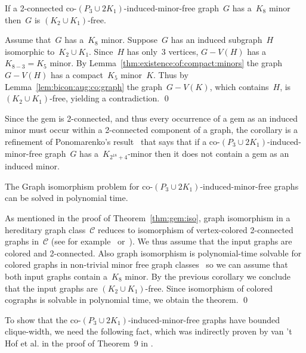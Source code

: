 \documentclass[envcountsame,envcountsect,11pt,a4paper]{llncs}
\renewenvironment{proof}{\begin{Proof}}{\qed\end{Proof}}
\begin{document}
\begin{corollary}
\label{cor:minor-free}
If a 2-connected co-$(P_{3} \cup 2 K_{1})$-induced-minor-free graph~$G$ has a~$K_8$ minor then~$G$ is $(K_{2} \cup K_{1})$-free.
\end{corollary}
\begin{proof}
Assume that~$G$ has a~$K_8$ minor. 
Suppose~$G$ has an induced subgraph~$H$ isomorphic to~$K_{2} \cup K_{1}$. Since~$H$ has only~$3$ vertices,
$G-V(H)$ has a~$K_{8-3} = K_5$ minor. By Lemma~\ref{thm:existence:of:compact:minors} the graph~$G-V(H)$ has a compact~$K_5$ minor~$K$.
Thus by Lemma~\ref{lem:bicon:aug:co:graph} the graph~$G-V(K)$, which contains~$H$, is $(K_{2} \cup K_{1})$-free, yielding a contradiction.
\end{proof}

Since the gem is 2-connected, and thus every occurrence of a gem as an induced minor must occur within a 2-connected component of a graph, the
corollary is a refinement of Ponomarenko's result~\cite{Ponomarenko88} that says that if a co-$(P_{3} \cup 2 K_{1})$-induced-minor-free
graph~$G$ has a~$K_{2^{18}+4}$-minor then it does not contain a gem as an induced minor.

\begin{theorem}
\label{thm:ger:house:iso}
The Graph isomorphism problem for co-$(P_{3} \cup 2 K_{1})$-induced-minor-free graphs can be solved in polynomial time.
\end{theorem}
\begin{proof}
As mentioned in the proof of Theorem~\ref{thm:gem:iso}, graph isomorphism in a hereditary graph class~$\mathcal{C}$ reduces to
isomorphism of vertex-colored 2-connected graphs in~$\mathcal{C}$ (see for example~\cite{DBLP:conf/coco/DattaLNTW09} or~\cite{OtachiS14}).
We thus assume that the input graphs are colored and 2-connected. Also graph isomorphism is polynomial-time solvable for colored graphs in
non-trivial minor free graph classes~\cite{Ponomarenko88} so we can assume that both input graphs contain a~$K_8$ minor. By the previous
corollary we conclude that the input graphs are $(K_{2} \cup K_{1})$-free. Since isomorphism of colored cographs is solvable in polynomial
time, we obtain the theorem.
\end{proof}

To show that the co-$(P_{3} \cup 2 K_{1})$-induced-minor-free graphs have bounded clique-width, we need the following fact, which was indirectly proven by van 't Hof et al. in the proof of Theorem~9 in \cite{VantHofKaminskiPaulusmaSzeiderThilikos2012}.
\end{document}
